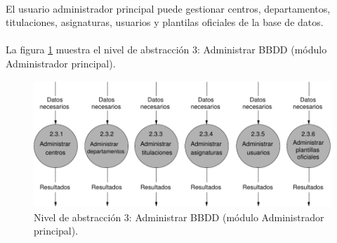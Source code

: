 \paragraph{}El usuario administrador principal puede gestionar centros,
departamentos, titulaciones, asignaturas, usuarios y plantilas
oficiales de la base de datos.

\paragraph{}La figura \ref{diagramaNivel3-AdministrarBBDD-adminPrincipal}
muestra el nivel de abstracción 3: Administrar BBDD (módulo Administrador
principal).

  \begin{figure}[!ht]
    \begin{center}
      \includegraphics[]{08.Analisis_Funcional/8.2.DFDs/Niveles/Nivel3/AdministradorPrincipal/AdministrarBBDD/Diagramas/nivel3-AdministrarBBDD.pdf}
      \caption{Nivel de abstracción 3: Administrar BBDD (módulo Administrador
      principal).}
      \label{diagramaNivel3-AdministrarBBDD-adminPrincipal}
    \end{center}
  \end{figure}
